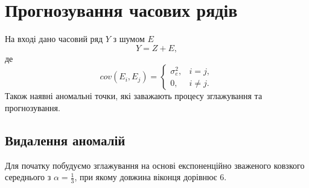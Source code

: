 \chapter{Прогнозування часових рядів}

На вході дано часовий ряд $Y$ з шумом $E$
\begin{equation*}
  Y = Z + E,
\end{equation*}
де
\begin{equation*}
  cov(E_i, E_j) =
    \begin{cases}
      \sigma_e^2,& i = j, \\
      0,&          i \neq j.
    \end{cases}
\end{equation*}
Також наявні аномальні точки,
які заважають процесу зглажування та прогнозування.

\section{Видалення аномалій}

Для початку побудуємо зглажування на основі експоненційно зваженого
ковзкого середнього з $\alpha = \frac{1}{3}$,
при якому довжина віконця дорівнює $6$.
\begin{center}
\end{center}

